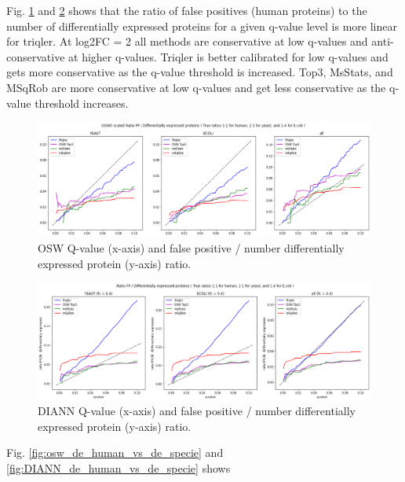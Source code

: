 \documentclass[10pt,letterpaper]{article}
\begin{document}
Fig. \ref{fig:osw_n_diff_exp} and \ref{fig:DIANN_n_diff_exp} shows that the ratio of false positives (human proteins) to the number of differentially expressed proteins for a given q-value level is more linear for triqler. At log2FC = 2 all methods are conservative at low q-values and anti-conservative at higher q-values. Triqler is better calibrated for low q-values and gets more conservative as the q-value threshold is increased. Top3, MsStats, and MSqRob are more conservative at low q-values and get less conservative as the q-value threshold increases.  

   
\begin{figure}[H]
    \centering
    \includegraphics[width=16cm]{../../result/2021-08-13_docs_plots/calibration_plot_scaled.png}
    \caption{OSW Q-value (x-axis) and false positive / number differentially expressed protein (y-axis) ratio.}
    \label{fig:osw_n_diff_exp}
\end{figure}

\begin{figure}[H]
    \centering
    \includegraphics[width=16cm]{../../result/2021-08-13_docs_plots/DIANN_calibration_plot.png}
    \caption{DIANN Q-value (x-axis) and false positive / number differentially expressed protein (y-axis) ratio.}
    \label{fig:DIANN_n_diff_exp}
\end{figure}

Fig. \ref{fig:osw_de_human_vs_de_specie} and \ref{fig:DIANN_de_human_vs_de_specie} shows  
\end{document}
